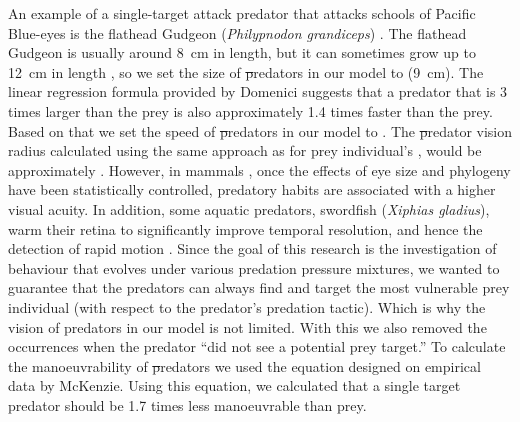 An example of a single-target attack predator that attacks schools of Pacific Blue-eyes is the flathead Gudgeon (\emph{Philypnodon grandiceps}) \cite{herbertread2016threedimensional}. The flathead Gudgeon is usually around \SI{8}{\cm} in length, but it can sometimes grow up to \SI{12}{\cm} in length \cite{pusey2004freshwater}, so we set the size of \st predators in our model to  (\SI{9}{\cm}). The linear regression formula provided by Domenici \cite{domenici2001scaling} suggests that a predator that is 3 times larger than the prey is also approximately \num{1.4} times faster than the prey. Based on that we set the speed of \st predators in our model to . The \st predator vision radius calculated using the same approach as for prey individual's \cite{hairston1982fish,pita2015vision,tyrrell2013looking}, would be approximately . However, in mammals \cite{veilleux2014visual}, once the effects of eye size and phylogeny have been statistically controlled, predatory habits are associated with a higher visual acuity. In addition, some aquatic predators, \eg swordfish (\emph{Xiphias gladius}), warm their retina to significantly improve temporal resolution, and hence the detection of rapid motion \cite{fritsches2005warm}. Since the goal of this research is the investigation of behaviour that evolves under various predation pressure mixtures, we wanted to guarantee that the predators can always find and target the most vulnerable prey individual (with respect to the predator's predation tactic). Which is why the vision of predators in our model is not limited. With this we also removed the occurrences when the predator ``did not see a potential prey target.'' To calculate the manoeuvrability of \st predators we used the equation designed on empirical data by McKenzie\etal \cite{mckenzie2007locomotion}. Using this equation, we calculated that a single target predator should be \num{1.7} times less manoeuvrable than prey.

